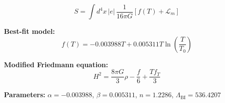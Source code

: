 
\begin{equation}
  S = \int d^4x \, |e| \, \frac{1}{16\pi G} \left[ f(T) + \mathcal{L}_m \right]
\end{equation}

\textbf{Best-fit model:}
\begin{equation}
  f(T) = -0.003988 T + 0.005311 T \ln\!\left(\frac{T}{T_0}\right)
\end{equation}

\textbf{Modified Friedmann equation:}
\begin{equation}
  H^2 = \frac{8\pi G}{3} \rho - \frac{f}{6} + \frac{T f_T}{3}
\end{equation}

\textbf{Parameters:}
$\alpha = -0.003988$, \quad
$\beta = 0.005311$, \quad
$n = 1.2286$, \quad
$\Lambda_{\text{BI}} = 536.4207$